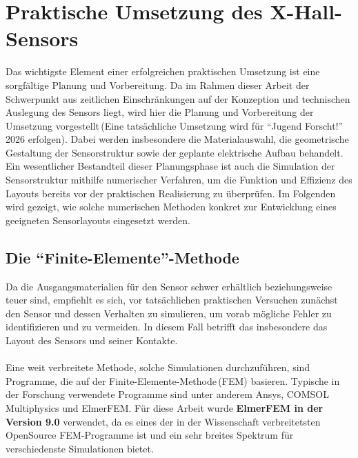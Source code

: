 \documentclass[12pt, a4paper]{article}
\begin{document}
\section{Praktische Umsetzung des X-Hall-Sensors}
Das wichtigste Element einer erfolgreichen praktischen Umsetzung ist eine sorgfältige Planung und Vorbereitung. Da im Rahmen dieser Arbeit der Schwerpunkt aus zeitlichen Einschränkungen auf der Konzeption und technischen Auslegung des Sensors liegt, wird hier die Planung und Vorbereitung der Umsetzung vorgestellt\,(Eine tatsächliche Umsetzung wird für ``Jugend Forscht!'' 2026 erfolgen). \newline
Dabei werden insbesondere die Materialauswahl, die geometrische Gestaltung der Sensorstruktur sowie der geplante elektrische Aufbau behandelt. Ein wesentlicher Bestandteil dieser Planungsphase ist auch die Simulation der Sensorstruktur mithilfe numerischer Verfahren, um die Funktion und Effizienz des Layouts bereits vor der praktischen Realisierung zu überprüfen. Im Folgenden wird gezeigt, wie solche numerischen Methoden konkret zur Entwicklung eines geeigneten Sensorlayouts eingesetzt werden.

\subsection{Die ``Finite-Elemente''-Methode}
Da die Ausgangsmaterialien für den Sensor schwer erhältlich beziehungsweise teuer sind, empfiehlt es sich, vor tatsächlichen praktischen Versuchen zunächst den Sensor und dessen Verhalten zu simulieren, um vorab mögliche Fehler zu identifizieren und zu vermeiden. \newline
In diesem Fall betrifft das insbesondere das Layout des Sensors und seiner Kontakte.\paragraph{}

Eine weit verbreitete Methode, solche Simulationen durchzuführen, sind Programme, die auf der Finite-Elemente-Methode\,(FEM) basieren. Typische in der Forschung verwendete Programme sind unter anderem Ansys, COMSOL Multiphysics und ElmerFEM.\newline
Für diese Arbeit wurde \textbf{ElmerFEM in der Version 9.0} verwendet, da es eines der in der Wissenschaft verbreitetsten OpenSource FEM-Programme ist und ein sehr breites Spektrum für verschiedenste Simulationen bietet.\paragraph{}
\end{document}
